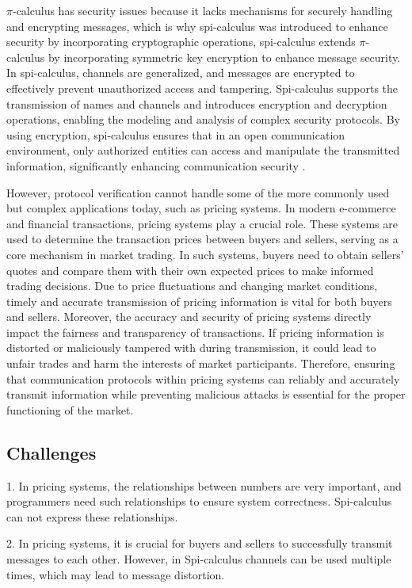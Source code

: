 \documentclass[master,english]{kuisthesis}
\theoremstyle{definition}
\begin{document}
$\pi$-calculus has security issues because it lacks mechanisms for securely handling and encrypting messages, which is why spi-calculus was introduced to enhance security by incorporating cryptographic operations, spi-calculus extends $\pi$-calculus by incorporating symmetric key encryption to enhance message security\cite{?}. In spi-calculus, channels are generalized, and messages are encrypted to effectively prevent unauthorized access and tampering. Spi-calculus supports the transmission of names and channels and introduces encryption and decryption operations, enabling the modeling and analysis of complex security protocols. By using encryption, spi-calculus ensures that in an open communication environment, only authorized entities can access and manipulate the transmitted information, significantly enhancing communication security \cite{?}.

However, protocol verification cannot handle some of the more commonly used but complex applications today, such as pricing systems. In modern e-commerce and financial transactions, pricing systems play a crucial role. These systems are used to determine the transaction prices between buyers and sellers, serving as a core mechanism in market trading. In such systems, buyers need to obtain sellers' quotes and compare them with their own expected prices to make informed trading decisions. Due to price fluctuations and changing market conditions, timely and accurate transmission of pricing information is vital for both buyers and sellers.
Moreover, the accuracy and security of pricing systems directly impact the fairness and transparency of transactions. If pricing information is distorted or maliciously tampered with during transmission, it could lead to unfair trades and harm the interests of market participants. Therefore, ensuring that communication protocols within pricing systems can reliably and accurately transmit information while preventing malicious attacks is essential for the proper functioning of the market.

\subsection{Challenges}
1. In pricing systems, the relationships between numbers are very important, and programmers need such relationships to ensure system correctness. Spi-calculus can not express these relationships.

2. In pricing systems, it is crucial for buyers and sellers to successfully transmit messages to each other. However, in Spi-calculus channels can be used multiple times, which may lead to message distortion.
\end{document}
